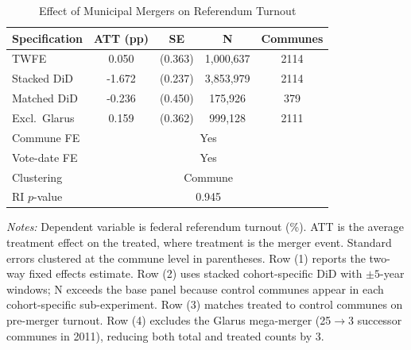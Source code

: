 \begin{table}[htbp]
\centering
\caption{Effect of Municipal Mergers on Referendum Turnout}
\label{tab:main}
\begin{tabular}{lcccc}
\toprule
Specification & ATT (pp) & SE & N & Communes \\
\midrule
TWFE & 0.050 & (0.363) & 1,000,637 & 2114 \\
Stacked DiD & -1.672 & (0.237) & 3,853,979 & 2114 \\
Matched DiD & -0.236 & (0.450) & 175,926 & 379 \\
Excl.\ Glarus & 0.159 & (0.362) & 999,128 & 2111 \\
\midrule
Commune FE & \multicolumn{4}{c}{Yes} \\
Vote-date FE & \multicolumn{4}{c}{Yes} \\
Clustering & \multicolumn{4}{c}{Commune} \\
RI $p$-value & \multicolumn{4}{c}{0.945} \\
\bottomrule
\end{tabular}
\begin{minipage}{0.9\textwidth}
\footnotesize
\emph{Notes:} Dependent variable is federal referendum turnout (\%). ATT is the average treatment effect on the treated, where treatment is the merger event. Standard errors clustered at the commune level in parentheses. Row (1) reports the two-way fixed effects estimate. Row (2) uses stacked cohort-specific DiD with $\pm 5$-year windows; N exceeds the base panel because control communes appear in each cohort-specific sub-experiment. Row (3) matches treated to control communes on pre-merger turnout. Row (4) excludes the Glarus mega-merger (25$\to$3 successor communes in 2011), reducing both total and treated counts by 3.
\end{minipage}
\end{table}
